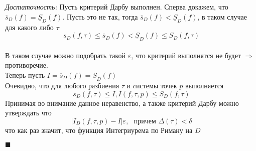 \textit{Достаточность: } Пусть критерий Дарбу выполнен. Сперва докажем, что $\overline{s}_D(f) = \underline{S}_D(f)$. Пусть это не так, тогда $\overline{s}_D(f) < \underline{S}_D(f)$, в таком случае для какого либо $\tau$ 
\[s_D(f, \tau) \leq \overline{s}_D(f) < \underline{S}_D(f) \leq S_D(f, \tau)\] \\
В таком случае можно подобрать такой $\varepsilon$, что критерий выполнятся не будет $\Rightarrow$ противоречие. \\
Теперь пусть $I = \overline{s}_D(f) = \underline{S}_D(f) $ \\
Очевидно, что для любого разбиения $\tau$ и cистемы точек $p$ выполняется
\[s_D(f, \tau) \leq I, I(f, \tau, p) \leq S_D(f, \tau)\] 
Принимая во внимание данное неравенство, а также критерий Дарбу можно утверждать что 
\[|I_D(f, \tau, p) - I| \varepsilon, \ \ \ \text{причем } \Delta(\tau) < \delta\]
что как раз значит, что функция Интегриурема по Риману на $D$
\begin{flushright}
$\blacksquare$
\end{flushright}

